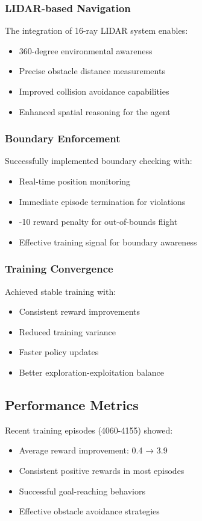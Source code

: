 \documentclass[12pt,a4paper]{article}
\begin{document}
\subsubsection{LIDAR-based Navigation}
The integration of 16-ray LIDAR system enables:
\begin{itemize}
    \item 360-degree environmental awareness
    \item Precise obstacle distance measurements
    \item Improved collision avoidance capabilities
    \item Enhanced spatial reasoning for the agent
\end{itemize}

\subsubsection{Boundary Enforcement}
Successfully implemented boundary checking with:
\begin{itemize}
    \item Real-time position monitoring
    \item Immediate episode termination for violations
    \item -10 reward penalty for out-of-bounds flight
    \item Effective training signal for boundary awareness
\end{itemize}

\subsubsection{Training Convergence}
Achieved stable training with:
\begin{itemize}
    \item Consistent reward improvements
    \item Reduced training variance
    \item Faster policy updates
    \item Better exploration-exploitation balance
\end{itemize}

\subsection{Performance Metrics}

Recent training episodes (4060-4155) showed:
\begin{itemize}
    \item Average reward improvement: 0.4 → 3.9
    \item Consistent positive rewards in most episodes
    \item Successful goal-reaching behaviors
    \item Effective obstacle avoidance strategies
\end{itemize}
\end{document}
